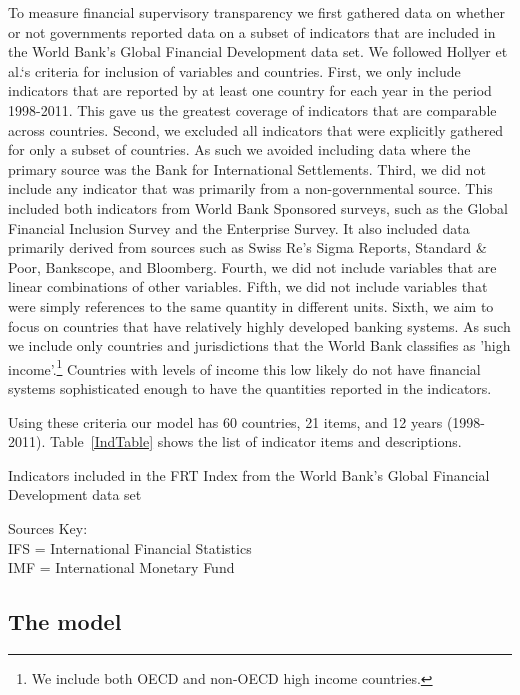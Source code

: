\documentclass[a4paper]{article}
\begin{document}
To measure financial supervisory transparency we first gathered data on whether or not governments reported data on a subset of indicators that are included in the World Bank's Global Financial Development data set. We followed Hollyer et al.`s \citeyearpar{Hollyer2014} criteria for inclusion of variables and countries. First, we only include indicators that are reported by at least one country for each year in the period 1998-2011. This gave us the greatest coverage of indicators that are comparable across countries. Second, we excluded all indicators that were explicitly gathered for only a subset of countries. As such we avoided including data where the primary source was the Bank for International Settlements. Third, we did not include any indicator that was primarily from a non-governmental source. This included both indicators from World Bank Sponsored surveys, such as the Global Financial Inclusion Survey and the Enterprise Survey. It also included data primarily derived from sources such as Swiss Re's Sigma Reports, Standard \& Poor, Bankscope, and Bloomberg. Fourth, we did not include variables that are linear combinations of other variables. Fifth, we did not include variables that were simply references to the same quantity in different units. Sixth, we aim to focus on countries that have relatively highly developed banking systems. As such we include only countries and jurisdictions that the World Bank classifies as 'high income'.\footnote{We include both OECD and non-OECD high income countries.} Countries with levels of income this low likely do not have financial systems sophisticated enough to have the quantities reported in the indicators. 

Using these criteria our model has 60 countries, 21 items, and 12 years (1998-2011). Table~\ref{IndTable} shows the list of indicator items and descriptions.  

\begin{table}[ht]
    \caption{Indicators included in the FRT Index from the World Bank's Global Financial Development data set}
    \label{IndTable}
    \vspace{0.3cm}
    \scalebox{0.95}{
        
    }
    {\scriptsize{Sources Key:\\ 
    IFS = International Financial Statistics\\
    IMF = International Monetary Fund}}
\end{table}

\subsection{The model}
\end{document}
